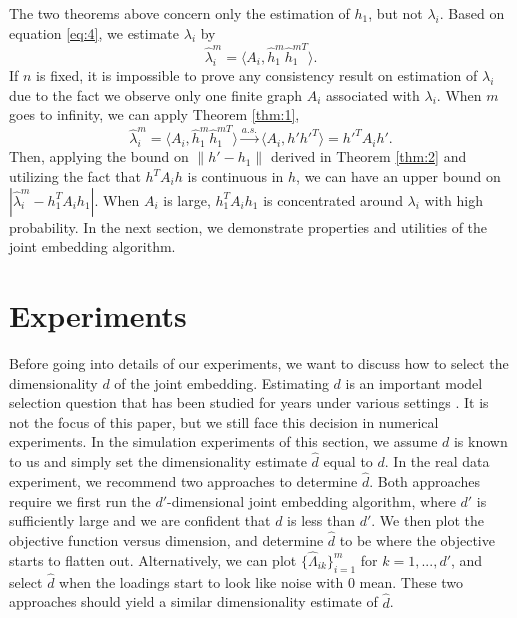 \documentclass[10pt,journal,compsoc]{IEEEtran}
\begin{document}
\noindent The two theorems above concern only the estimation of $h_1$, but not $\lambda_i$. Based on equation \eqref{eq:4}, we estimate $\lambda_i$ by
\[\hat{\lambda}_i^m= \langle A_i,\hat{h}_1^m \hat{h}_1^{m T} \rangle. \]
If $n$ is fixed, it is impossible to prove any consistency result on estimation of $\lambda_i$ due to the fact we observe only one finite graph $A_i$ associated with $\lambda_i$. When $m$ goes to infinity, we can apply Theorem \ref{thm:1},
\[\hat{\lambda}_i^m = \langle A_i,\hat{h}_1^m \hat{h}_1^{mT} \rangle \overset{a.s.}{\rightarrow} \langle A_i,h' h'^T \rangle = h'^T A_i h'.\]
Then, applying the bound on $\|h'-h_1\|$ derived in Theorem \ref{thm:2} and utilizing the fact that $h^T A_i h$ is continuous in $h$, we can have an upper bound on $|\hat{\lambda}_i^m - h_1^T A_i h_1|$. When $A_i$ is large, $h_1^T A_i h_1$ is concentrated around $\lambda_i$ with high probability. In the next section, we demonstrate properties and utilities of the joint embedding algorithm. 

\section{Experiments}
Before going into details of our experiments, we want to discuss how to select the dimensionality $d$ of the joint embedding. Estimating $d$ is an important model selection question that has been studied for years under various settings \cite{kohavi1995study}. It is not the focus of this paper, but we still face this decision in numerical experiments. In the simulation experiments of this section, we assume $d$ is known to us and simply set the dimensionality estimate $\hat{d}$ equal to $d$. In the real data experiment, we recommend two approaches to determine $\hat{d}$. Both approaches require we first run the $d'$-dimensional joint embedding algorithm, where $d'$ is sufficiently large and we are confident that $d$ is less than $d'$. We then plot the objective function versus dimension, and determine $\hat{d}$ to be where the objective starts to flatten out. Alternatively, we can plot $\{\hat{\Lambda}_{ik}\}_{i=1}^m$ for $k=1,...,d'$, and select $\hat{d}$ when the loadings start to look like noise with $0$ mean. These two approaches should yield a similar dimensionality estimate of $\hat{d}$. 
\end{document}
